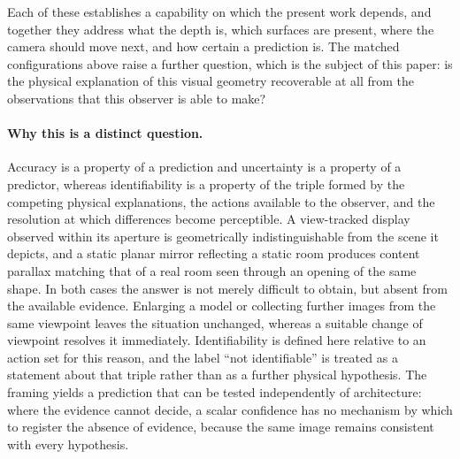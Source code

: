 Each of these establishes a capability on which the present work depends, and
together they address what the depth is, which surfaces are present, where the
camera should move next, and how certain a prediction is. The matched
configurations above raise a further question, which is the subject of this paper:
is the physical explanation of this visual geometry recoverable at all from the
observations that this observer is able to make?

\paragraph{Why this is a distinct question.}
Accuracy is a property of a prediction and uncertainty is a property of a
predictor, whereas identifiability is a property of the triple formed by the
competing physical explanations, the actions available to the observer, and the
resolution at which differences become perceptible. A view-tracked display
observed within its aperture is geometrically indistinguishable from the scene it
depicts, and a static planar mirror reflecting a static room produces content
parallax matching that of a real room seen through an opening of the same shape.
In both cases the answer is not merely difficult to obtain, but absent from the
available evidence. Enlarging a model or collecting further images from the same
viewpoint leaves the situation unchanged, whereas a suitable change of viewpoint
resolves it immediately. Identifiability is defined here relative to an action
set for this reason, and the label ``not identifiable'' is treated as a statement
about that triple rather than as a further physical hypothesis. The framing
yields a prediction that can be tested independently of architecture: where the
evidence cannot decide, a scalar confidence has no mechanism by which to register
the absence of evidence, because the same image remains consistent with every
hypothesis.

